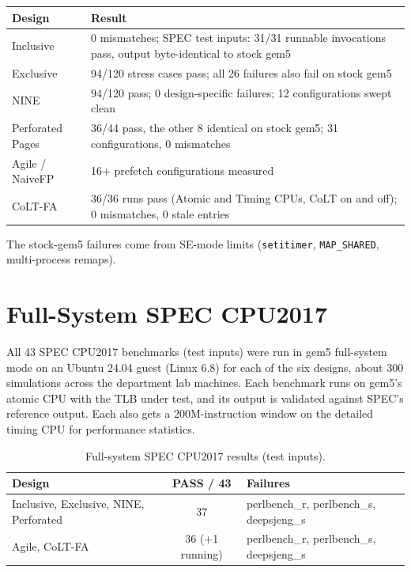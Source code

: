 \documentclass[11pt]{article}
\begin{document}
\begin{table}[H]
\centering
\begin{tabularx}{\textwidth}{@{}l L@{}}
\toprule
\textbf{Design} & \textbf{Result} \\
\midrule
Inclusive & 0 mismatches; SPEC test inputs: 31/31 runnable invocations pass, output byte-identical to stock gem5 \\
Exclusive & 94/120 stress cases pass; all 26 failures also fail on stock gem5 \\
NINE & 94/120 pass; 0 design-specific failures; 12 configurations swept clean \\
Perforated Pages & 36/44 pass, the other 8 identical on stock gem5; 31 configurations, 0 mismatches \\
Agile / NaiveFP & 16+ prefetch configurations measured \\
CoLT-FA & 36/36 runs pass (Atomic and Timing CPUs, CoLT on and off); 0 mismatches, 0 stale entries \\
\bottomrule
\end{tabularx}
\end{table}

\noindent The stock-gem5 failures come from SE-mode limits (\texttt{setitimer}, \texttt{MAP\_SHARED}, multi-process remaps).

\section{Full-System SPEC CPU2017}
All 43 SPEC CPU2017 benchmarks (test inputs) were run in gem5 full-system mode on an Ubuntu 24.04 guest (Linux 6.8) for each of the six designs, about 300 simulations across the department lab machines. Each benchmark runs on gem5's atomic CPU with the TLB under test, and its output is validated against SPEC's reference output. Each also gets a 200M-instruction window on the detailed timing CPU for performance statistics.

\begin{table}[H]
\centering
\begin{tabularx}{\textwidth}{@{}l c L@{}}
\toprule
\textbf{Design} & \textbf{PASS / 43} & \textbf{Failures} \\
\midrule
Inclusive, Exclusive, NINE, Perforated & 37 & perlbench\_r, perlbench\_s, deepsjeng\_s \\
Agile, CoLT-FA & 36 (+1 running) & perlbench\_r, perlbench\_s, deepsjeng\_s \\
\bottomrule
\end{tabularx}
\caption{Full-system SPEC CPU2017 results (test inputs).}
\end{table}
\end{document}
